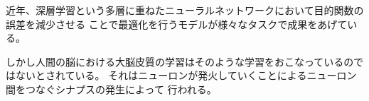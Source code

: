 \abstract
近年、深層学習という多層に重ねたニューラルネットワークにおいて目的関数の誤差を減少させる
ことで最適化を行うモデルが様々なタスクで成果をあげている。

しかし人間の脳における大脳皮質の学習はそのような学習をおこなっているのではないとされている。
それはニューロンが発火していくことによるニューロン間をつなぐシナプスの発生によって
行われる。
